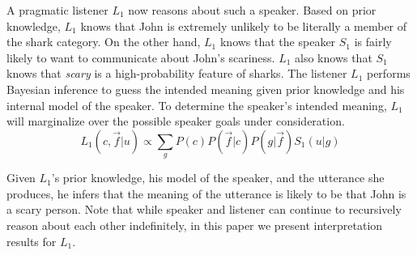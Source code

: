 \documentclass[10pt,letterpaper]{article}
\begin{document}
A pragmatic listener $L_1$ now reasons about such a speaker. Based on prior knowledge, $L_1$ knows that John is extremely unlikely to be literally a member of the shark category. On the other hand, $L_1$ knows that the speaker $S_1$ is fairly likely to want to communicate about John's scariness. $L_1$ also knows that $S_1$ knows that \emph{scary} is a high-probability feature of sharks. The listener $L_1$ performs Bayesian inference to guess the intended meaning given prior knowledge and his internal model of the speaker. To determine the speaker's intended meaning, $L_1$ will marginalize over the possible speaker goals under consideration.
$$
L_1 (c, \vec f | u) \propto \sum_{g}{P(c) P(\vec f | c) P (g|\vec f) S_{1} (u|g)}
$$

Given $L_1$'s prior knowledge, his model of the speaker, and the utterance she produces, he infers that the meaning of the utterance is likely to be that John is a scary person. Note that while speaker and listener can continue to recursively reason about each other indefinitely, in this paper we present interpretation results for $L_1$.
\end{document}
